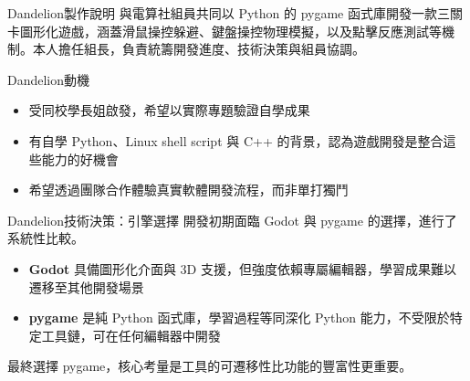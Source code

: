 \documentclass{article}
\begin{document}

\begin{large}

\begin{boxpar}{Dandelion}{製作說明}
與電算社組員共同以 Python 的 pygame 函式庫開發一款三關卡圖形化遊戲，涵蓋滑鼠操控躲避、鍵盤操控物理模擬，以及點擊反應測試等機制。本人擔任組長，負責統籌開發進度、技術決策與組員協調。
\end{boxpar}

\begin{boxpar}{Dandelion}{動機}
    \begin{itemize}
        \item 受同校學長姐啟發，希望以實際專題驗證自學成果
        \item 有自學 Python、Linux shell script 與 C++ 的背景，認為遊戲開發是整合這些能力的好機會
        \item 希望透過團隊合作體驗真實軟體開發流程，而非單打獨鬥
    \end{itemize}
\end{boxpar}

\begin{boxpar}{Dandelion}{技術決策：引擎選擇}
開發初期面臨 Godot 與 pygame 的選擇，進行了系統性比較。

\begin{itemize}
    \item \textbf{Godot} 具備圖形化介面與 3D 支援，但強度依賴專屬編輯器，學習成果難以遷移至其他開發場景
    \item \textbf{pygame} 是純 Python 函式庫，學習過程等同深化 Python 能力，不受限於特定工具鏈，可在任何編輯器中開發
\end{itemize}

最終選擇 pygame，核心考量是工具的可遷移性比功能的豐富性更重要。
\end{boxpar}


\end{large}
\end{document}

